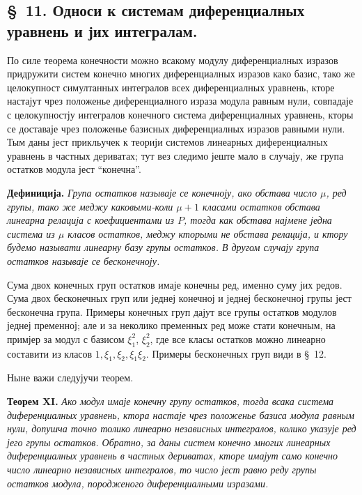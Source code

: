 ﻿\documentclass[11pt]{article}
\begin{document}

\setcounter{footnote}{23}
\subsection*{\S~11. Односи к системам диференциалных уравнень и јих интегралам.}

По силе теорема конечности можно всакому модулу диференциалных изразов придружити систем конечно многих диференциалных изразов како базис, тако же целокупност симултанных интегралов всех диференциалных уравнень, кторе настајут чрез положенье диференциалного израза модула равным нули, совпадаје с целокупностју интегралов конечного система диференциалных уравнень, кторы се доставаје чрез положенье базисных диференциалных изразов равными нули. Тым даны јест прикльучек к теорији системов линеарных диференциалных уравнень в частных дериватах; тут вез следимо јеште мало в случају, же група остатков модула јест ``конечна''.

\textbf{Дефиниција.} \textit{Група остатков называје се конечноју, ако обстава число \(\mu\), ред групы, тако же меджу каковыми-коли \(\mu+1\) класами остатков обстава линеарна релација с коефициентами из \(P\), тогда как обстава најмене једна система из \(\mu\) класов остатков, меджу кторыми не обстава релација, и ктору будемо называти линеарну базу групы остатков. В другом случају група остатков называје се бесконечноју.}

Сума двох конечных груп остатков имаје конечны ред, именно суму јих редов. Сума двох бесконечных груп или једнеј конечној и једнеј бесконечној групы јест бесконечна група. Примеры конечных груп дајут все групы остатков модулов једнеј пременној; але и за неколико пременных ред може стати конечным, на примјер за модул с базисом \(\xi_1^2\), \(\xi_2^2\), где все класы остатков можно линеарно составити из класов \(1,\xi_1,\xi_2,\xi_1\xi_2\). Примеры бесконечных груп види в \S~12.

Ныне важи следујучи теорем.

\textbf{Теорем XI.} \textit{Ако модул имаје конечну групу остатков, тогда всака система диференциалных уравнень, ктора настаје чрез положенье базиса модула равным нули, допушча точно толико линеарно независных интегралов, колико указује ред јего групы остатков. Обратно, за даны систем конечно многих линеарных диференциалных уравнень в частных дериватах, кторе имајут само конечно число линеарно независных интегралов, то число јест равно реду групы остатков модула, породженого диференциалными изразами.}
\end{document}
